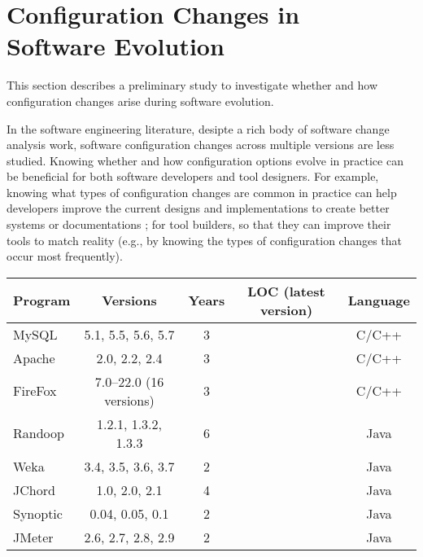 \section{Configuration Changes in\\ Software Evolution}
\label{sec:study}

This section describes a preliminary study to investigate whether
and how configuration changes arise during software evolution.

In the software engineering literature, desipte a rich body of
software change analysis work, 
software configuration changes across multiple
versions are less studied.
Knowing whether and how configuration options evolve in practice
can be beneficial for both software developers
and tool designers. For example, knowing what types
of configuration changes are common in practice
can help developers improve the current designs and
implementations to create better systems or documentations
; for tool builders, so that they can improve their tools
to match reality (e.g., by knowing the types of configuration
changes that occur most frequently).


\begin{table}[t]
\vspace{1mm}
\centering
\small{
\setlength{\tabcolsep}{.40\tabcolsep}
\begin{tabular}{|l||c|c|c|c|}
\hline
 Program & Versions & Years & LOC (latest version)  & Language\\
 \hline
 \hline
 MySQL & 5.1, 5.5, 5.6, 5.7 & 3 && C/C++\\
 Apache& 2.0, 2.2, 2.4 & 3  & &C/C++\\
 FireFox& 7.0--22.0 (16 versions) & 3  & &C/C++\\
 Randoop & 1.2.1, 1.3.2, 1.3.3 & 6 &    &Java\\
 Weka & 3.4, 3.5, 3.6, 3.7  & 2  &  &Java\\
 JChord & 1.0, 2.0, 2.1 &  4 &   &Java\\
 Synoptic & 0.04, 0.05, 0.1 & 2   & &Java\\
 JMeter & 2.6, 2.7, 2.8, 2.9& 2   & &Java\\
\hline
\end{tabular}
}
\vspace{-2mm}
\end{table}


